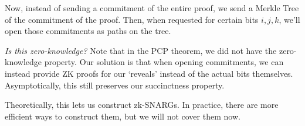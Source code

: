 Now, instead of sending a commitment of the entire proof, we send a Merkle Tree of the commitment of the proof. Then, when requested for certain bits $i, j, k$, we'll open those commitments as paths on the tree.

\emph{Is this zero-knowledge?} Note that in the PCP theorem, we did not have the zero-knowledge property. Our solution is that when opening commitments, we can instead provide ZK proofs for our `reveals' instead of the actual bits themselves. Asymptotically, this still preserves our succinctness property.

Theoretically, this lets us construct zk-SNARGs. In practice, there are more efficient ways to construct them, but we will not cover them now.
